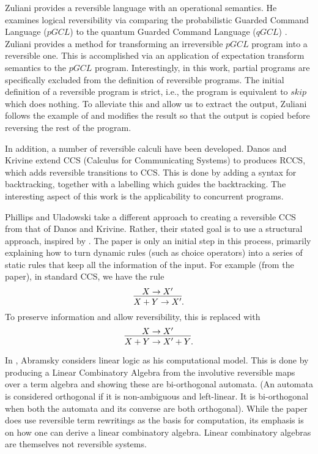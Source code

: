 Zuliani \cite{zuliani01:reversibility} provides a reversible language with an operational
semantics. He examines logical reversibility via comparing the probabilistic Guarded Command
Language ($pGCL$) \cite{MorganIver99} to the quantum Guarded Command Language ($qGCL$)
\cite{sanders:quantum}. Zuliani provides a method for transforming an irreversible $pGCL$ program
into a reversible one. This is accomplished via an application of expectation transform semantics to
the $pGCL$ program. Interestingly, in this work, partial programs are specifically excluded from the
definition of reversible programs. The initial definition of a reversible program is strict, i.e.,
the program is equivalent to $skip$ which does nothing. To alleviate this and allow us to extract
the output, Zuliani follows the example of \cite{bennett:1973reverse} and modifies the result so
that the output is copied before reversing the rest of the program.

In addition, a number of reversible calculi have been developed. Danos and Krivine
\cite{danos2004reversible} extend CCS (Calculus for Communicating Systems)
\cite{milner1980calculus,milner1989communication} to produces RCCS, which adds reversible
transitions to CCS. This is done by adding a syntax for backtracking, together with a labelling
which guides the backtracking. The interesting aspect of this work is the applicability to
concurrent programs.

Phillips and Uladowski \cite{phillips2006operational} take a different approach to creating a
reversible CCS from that of Danos and Krivine. Rather, their stated goal is to use a structural
approach, inspired by \cite{abramsky05:reversible}. The paper is only an initial step in this
process, primarily explaining how to turn dynamic rules (such as choice operators) into a series of
static rules that keep all the information of the input. For example (from the paper), in standard
CCS, we have the rule
\[
  \infer{X+Y \to X'}{X\to X'}.
\]
To preserve information and allow reversibility, this is replaced with
\[
  \infer{X+Y \to X' +Y}{X\to X'}.
\]

In \cite{abramsky05:reversible}, Abramsky considers linear logic as his computational model. This is
done by producing a Linear Combinatory Algebra \cite{abramsky02:GOI} from the involutive reversible
maps over a term algebra and showing these are bi-orthogonal automata. (An automata is considered
orthogonal if it is non-ambiguous and left-linear. It is bi-orthogonal when both the automata and
its converse are both orthogonal). While the paper does use reversible term rewritings as the
basis for computation, its emphasis is on how one can derive a linear combinatory algebra.
Linear combinatory algebras are themselves not reversible systems.

